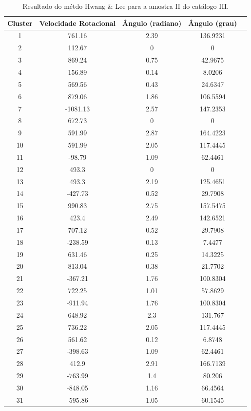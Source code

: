 {\scriptsize
\begin{longtable}{ccccc}
\caption{Resultado do métdo Hwang \& Lee para a amostra II do catálogo III.}\label{tab:norotationhwang}
\cline{1-4}
\multicolumn{1}{|l|}{\textbf{Cluster}} & \multicolumn{1}{l|}{\textbf{Velocidade Rotacional}} & \multicolumn{1}{l|}{\textbf{Ângulo (radiano)}} & \multicolumn{1}{l|}{\textbf{Ângulo (grau)}} \\ \hline
1 & 761.16 & 2.39 & 136.9231 \\ 
2 & 112.67 & 0 & 0 \\ 
3 & 869.24 & 0.75 & 42.9675 \\ 
4 & 156.89 & 0.14 & 8.0206 \\ 
5 & 569.56 & 0.43 & 24.6347 \\ 
6 & 879.06 & 1.86 & 106.5594 \\ 
7 & -1081.13 & 2.57 & 147.2353 \\ 
8 & 672.73 & 0 & 0 \\ 
9 & 591.99 & 2.87 & 164.4223 \\ 
10 & 591.99 & 2.05 & 117.4445 \\ 
11 & -98.79 & 1.09 & 62.4461 \\ 
12 & 493.3 & 0 & 0 \\ 
13 & 493.3 & 2.19 & 125.4651 \\ 
14 & -427.73 & 0.52 & 29.7908 \\ 
15 & 990.83 & 2.75 & 157.5475 \\ 
16 & 423.4 & 2.49 & 142.6521 \\ 
17 & 707.12 & 0.52 & 29.7908 \\ 
18 & -238.59 & 0.13 & 7.4477 \\ 
19 & 631.46 & 0.25 & 14.3225 \\ 
20 & 813.04 & 0.38 & 21.7702 \\ 
21 & -367.21 & 1.76 & 100.8304 \\ 
22 & 722.25 & 1.01 & 57.8629 \\ 
23 & -911.94 & 1.76 & 100.8304 \\ 
24 & 648.92 & 2.3 & 131.767 \\ 
25 & 736.22 & 2.05 & 117.4445 \\ 
26 & 561.62 & 0.12 & 6.8748 \\ 
27 & -398.63 & 1.09 & 62.4461 \\ 
28 & 412.9 & 2.91 & 166.7139 \\ 
29 & -763.99 & 1.4 & 80.206 \\ 
30 & -848.05 & 1.16 & 66.4564 \\ 
31 & -595.86 & 1.05 & 60.1545 \\ 

\end{longtable}}
